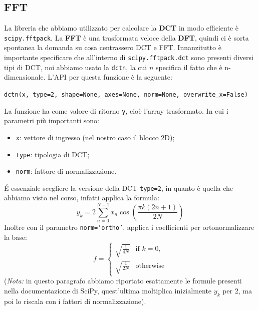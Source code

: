 \documentclass{article}
\begin{document}
\subsection{FFT}
La libreria che abbiamo utilizzato per calcolare la \textbf{DCT} in modo efficiente è \texttt{scipy.fftpack}. La \textbf{FFT} è una trasformata 
veloce della \textbf{DFT}, quindi ci è sorta spontanea la domanda su cosa centrassero DCT e FFT. Innanzitutto è importante 
specificare che all'interno di \texttt{scipy.fftpack.dct} sono presenti diversi tipi di DCT, noi abbiamo usato la \texttt{dctn}, la 
cui $n$ specifica il fatto che è n-dimensionale. L'API per questa funzione è la seguente:
\begin{center}
	\texttt{dctn(x, type=2, shape=None, axes=None, norm=None, overwrite\_x=False)}
\end{center}
La funzione ha come valore di ritorno \texttt{y}, cioè l'array trasformato.
In cui i parametri più importanti sono: 
\begin{itemize}
	\item \texttt{x}: vettore di ingresso (nel nostro caso il blocco 2D);
	\item \texttt{type}: tipologia di DCT;
	\item \texttt{norm}: fattore di normalizzazione.
\end{itemize}
\'E essenziale scegliere la versione della DCT \texttt{type=2}, in quanto è quella che abbiamo visto nel corso, infatti applica la formula:
\[
y_k = 2 \sum_{n=0}^{N-1} x_n \cos \left( \frac{\pi k (2n + 1)}{2N} \right)
\]
Inoltre con il parametro \texttt{norm='ortho'}, applica i coefficienti per ortonormalizzare la base:
\[
f = \begin{cases} 
\sqrt{\frac{1}{4N}} & \text{if } k = 0, \\ 
\sqrt{\frac{1}{2N}} & \text{otherwise} 
\end{cases}
\]
(\textit{Nota:} in questo paragrafo abbiamo riportato esattamente le formule presenti nella documentazione di SciPy, quest'ultima 
moltiplica inizialmente $y_k$ per 2, ma poi lo riscala con i fattori di normalizzazione). 
\vspace{1em}
\end{document}

